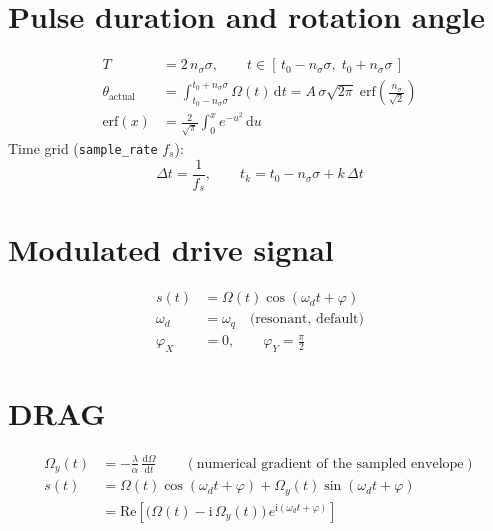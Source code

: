 \documentclass[11pt]{article}
\newcommand{\dd}{\mathrm{d}}
\newcommand{\ii}{\mathrm{i}}
\begin{document}
\section*{Pulse duration and rotation angle}
\begin{align}
  T &= 2\,n_\sigma \sigma, \qquad t \in \left[\,t_0 - n_\sigma\sigma,\; t_0 + n_\sigma\sigma\,\right] \\
  \theta_{\text{actual}} &= \int_{t_0 - n_\sigma\sigma}^{t_0 + n_\sigma\sigma} \Omega(t)\,\dd t
     = A\,\sigma\sqrt{2\pi}\;\mathrm{erf}\!\left(\frac{n_\sigma}{\sqrt 2}\right) \\
  \mathrm{erf}(x) &= \frac{2}{\sqrt{\pi}}\int_0^{x} e^{-u^2}\,\dd u
\end{align}
Time grid (\texttt{sample\_rate} $f_s$):
\begin{equation}
  \Delta t = \frac{1}{f_s}, \qquad t_k = t_0 - n_\sigma\sigma + k\,\Delta t
\end{equation}

\section*{Modulated drive signal}
\begin{align}
  s(t) &= \Omega(t)\cos(\omega_d t + \varphi) \\
  \omega_d &= \omega_q \quad \text{(resonant, default)} \\
  \varphi_X &= 0, \qquad \varphi_Y = \frac{\pi}{2}
\end{align}

\section*{DRAG}
\begin{align}
  \Omega_y(t) &= -\frac{\lambda}{\alpha}\,\frac{\dd\Omega}{\dd t}
  \qquad (\text{numerical gradient of the sampled envelope}) \\
  s(t) &= \Omega(t)\cos(\omega_d t + \varphi) + \Omega_y(t)\sin(\omega_d t + \varphi) \\
       &= \mathrm{Re}\!\left[\big(\Omega(t) - \ii\,\Omega_y(t)\big)\,e^{\ii(\omega_d t + \varphi)}\right]
\end{align}

\end{document}
